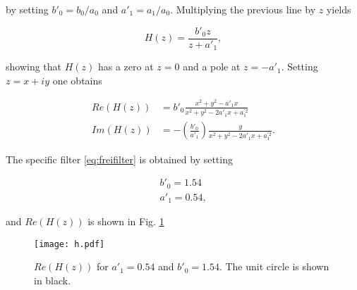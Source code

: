 \documentclass[12pt,a4paper]{article}
\begin{document}
by setting $b'_0=b_0/a_0$ and $a'_1=a_1/a_0$. Multiplying the previous line by $z$ yields

\begin{equation}\label{eq:iirf_trafofct_normal2}
H(z)=\frac{b'_0z}{z+a'_1},
\end{equation}

showing that $H(z)$ has a zero at $z=0$ and a pole at $z=-a'_1$. Setting $z=x+iy$ one obtains

\begin{align}
Re(H(z)) &= b'_0\frac{x^2+y^2-a'_1x}{x^2+y^2-2a'_1x+a_1^{'2}}\\
Im(H(z)) &= -\left(\frac{b'_0}{a'_1}\right)\frac{y}{x^2+y^2-2a'_1x+a_1^{'2}}.
\end{align}

The specific filter \eqref{eq:freifilter} is obtained by setting

\begin{align}
b'_0=1.54 \\
a'_1=0.54,
\end{align}

and $Re(H(z))$ is shown in Fig. \ref{fig:h}

\begin{figure}[H]
	\centering
	\texttt{[image: h.pdf]}
	\caption{$Re(H(z))$ for $a'_1=0.54$ and $b'_0=1.54$. The unit circle is shown in black.}\label{fig:h}
\end{figure}








\end{document}
